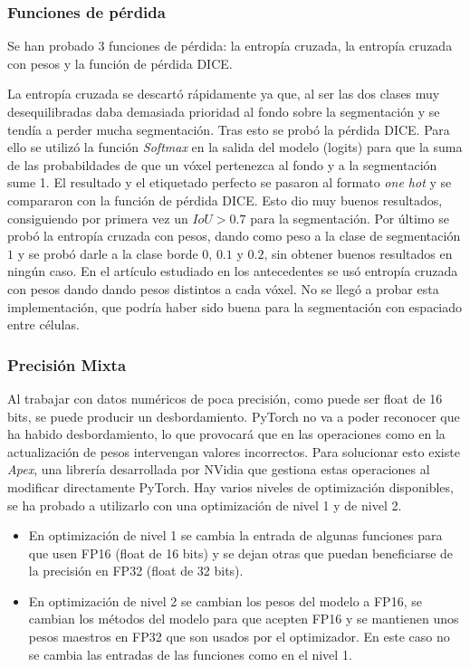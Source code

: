 \subsubsection{Funciones de pérdida}
Se han probado 3 funciones de pérdida: la entropía cruzada, la entropía cruzada con pesos y la función de pérdida DICE.

La entropía cruzada se descartó rápidamente ya que, al ser las dos clases muy desequilibradas daba demasiada prioridad al fondo sobre la segmentación y se tendía a perder mucha segmentación. 
Tras esto se probó la pérdida DICE. Para ello se utilizó la función \textit{Softmax} en la salida del modelo (logits) para que la suma de las probabildades de que un vóxel pertenezca al fondo y a la segmentación sume 1. El resultado y el etiquetado perfecto se pasaron al formato \textit{one hot} y se compararon con la función de pérdida DICE. Esto dio muy buenos resultados, consiguiendo por primera vez un $IoU>0.7$ para la segmentación.
Por último se probó la entropía cruzada con pesos, dando como peso a la clase de segmentación $1$ y se probó darle a la clase borde $0$, $0.1$ y $0.2$, sin obtener buenos resultados en ningún caso. En el artículo estudiado en los antecedentes \cite{Falk2019} se usó entropía cruzada con pesos dando dando pesos distintos a cada vóxel. No se llegó a probar esta implementación, que podría haber sido buena para la segmentación con espaciado entre células.

\subsubsection{Precisión Mixta}

Al trabajar con datos numéricos de poca precisión, como puede ser float de 16 bits, se puede producir un desbordamiento. PyTorch no va a poder reconocer que ha habido desbordamiento, lo que provocará que en las operaciones como en la actualización de pesos intervengan valores incorrectos. Para solucionar esto existe \textit{Apex}, una librería desarrollada por NVidia que gestiona estas operaciones al modificar directamente PyTorch. Hay varios niveles de optimización disponibles, se ha probado a utilizarlo con una optimización de nivel 1 y de nivel 2.
\begin{itemize}
\item En optimización de nivel 1 se cambia la entrada de algunas funciones para que usen FP16 (float de 16 bits) y se dejan otras que puedan beneficiarse de la precisión en FP32 (float de 32 bits).
\item En optimización de nivel 2 se cambian los pesos del modelo a FP16, se cambian los métodos del modelo para que acepten FP16 y se mantienen unos pesos maestros en FP32 que son usados por el optimizador. En este caso no se cambia las entradas de las funciones como en el nivel 1.
\end{itemize}

